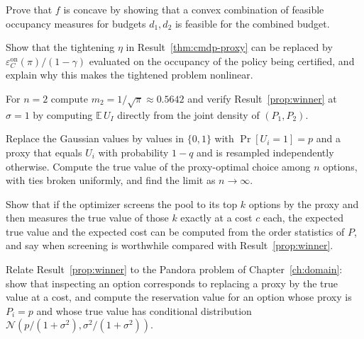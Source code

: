 \begin{exercise}
Prove that $f$ is concave by showing that a convex combination of feasible occupancy measures for budgets $d_1,d_2$ is feasible for the combined budget.
\end{exercise}

\begin{exercise}
Show that the tightening $\eta$ in Result~\ref{thm:cmdp-proxy} can be replaced by $\varepsilon_C^{\mathrm{on}}(\pi)/(1-\gamma)$ evaluated on the occupancy of the policy being certified, and explain why this makes the tightened problem nonlinear.
\end{exercise}

\begin{exercise}
For $n=2$ compute $m_2=1/\sqrt\pi\approx0.5642$ and verify Result~\ref{prop:winner} at $\sigma=1$ by computing $\mathbb E\,U_I$ directly from the joint density of $(P_1,P_2)$.
\end{exercise}

\begin{exercise}
Replace the Gaussian values by values in $\{0,1\}$ with $\Pr[U_i=1]=p$ and a proxy that equals $U_i$ with probability $1-q$ and is resampled independently otherwise. Compute the true value of the proxy-optimal choice among $n$ options, with ties broken uniformly, and find the limit as $n\to\infty$.\label{ex2:bernoulli-proxy}
\end{exercise}

\begin{exercise}
Show that if the optimizer screens the pool to its top $k$ options by the proxy and then measures the true value of those $k$ exactly at a cost $c$ each, the expected true value and the expected cost can be computed from the order statistics of $P$, and say when screening is worthwhile compared with Result~\ref{prop:winner}.
\end{exercise}

\begin{exercise}
Relate Result~\ref{prop:winner} to the Pandora problem of Chapter~\ref{ch:domain}: show that inspecting an option corresponds to replacing a proxy by the true value at a cost, and compute the reservation value for an option whose proxy is $P_i=p$ and whose true value has conditional distribution $\mathcal N(p/(1+\sigma^2),\sigma^2/(1+\sigma^2))$.
\end{exercise}

